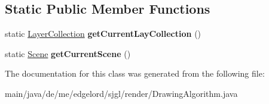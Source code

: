 \subsection*{Static Public Member Functions}
\begin{DoxyCompactItemize}
\item 
\mbox{\label{classde_1_1me_1_1edgelord_1_1sjgl_1_1render_1_1_drawing_algorithm_a8d19a8473e6d59e8e7376517d40fe14a}} 
static \mbox{\hyperlink{classde_1_1me_1_1edgelord_1_1sjgl_1_1layer_1_1_layer_collection}{Layer\+Collection}} {\bfseries get\+Current\+Lay\+Collection} ()
\item 
\mbox{\label{classde_1_1me_1_1edgelord_1_1sjgl_1_1render_1_1_drawing_algorithm_a1e0f3ebde00c23589fa915f676568f4a}} 
static \mbox{\hyperlink{classde_1_1me_1_1edgelord_1_1sjgl_1_1scene_1_1_scene}{Scene}} {\bfseries get\+Current\+Scene} ()
\end{DoxyCompactItemize}


The documentation for this class was generated from the following file\+:\begin{DoxyCompactItemize}
\item 
main/java/de/me/edgelord/sjgl/render/Drawing\+Algorithm.\+java\end{DoxyCompactItemize}
